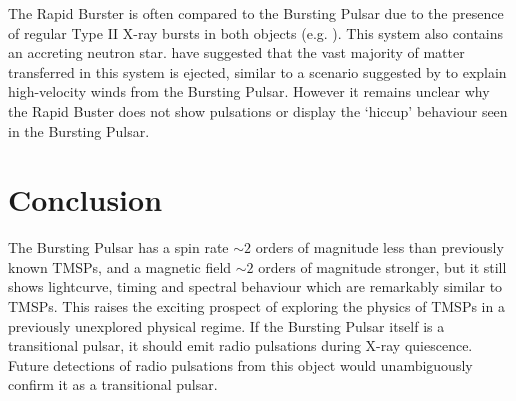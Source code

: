 \par The Rapid Burster is often compared to the Bursting Pulsar due to the presence of regular Type II X-ray bursts in both objects (e.g. \citealp{Lewin_BP}). This system also contains an accreting neutron star. \citealp{Iaria_RB} have suggested that the vast majority of matter transferred in this system is ejected, similar to a scenario suggested by \citealp{Degenaar_BPSpec} to explain high-velocity winds from the Bursting Pulsar. However it remains unclear why the Rapid Buster does not show pulsations or display the `hiccup' behaviour seen in the Bursting Pulsar.

\section{Conclusion}

\par The Bursting Pulsar has a spin rate $\sim2$ orders of magnitude less than previously known TMSPs, and a magnetic field $\sim2$ orders of magnitude stronger, but it still shows lightcurve, timing and spectral behaviour which are remarkably similar to TMSPs. This raises the exciting prospect of exploring the physics of TMSPs in a previously unexplored physical regime. If the Bursting Pulsar itself is a transitional pulsar, it should emit radio pulsations during X-ray quiescence. Future detections of radio pulsations from this object would unambiguously confirm it as a transitional pulsar.
